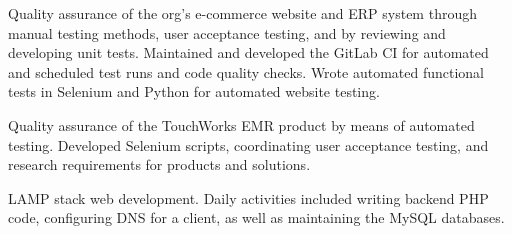\documentclass[10pt,a4paper]{altacv}
\begin{document}
\divider

Quality assurance of the org’s e-commerce website and ERP system through
manual testing methods, user acceptance testing, and by reviewing and developing unit 
tests. Maintained and developed the GitLab CI for automated and scheduled test 
runs and code quality checks. Wrote automated functional tests in Selenium and 
Python for automated website testing.

\divider

Quality assurance of the TouchWorks EMR product by means of automated testing.
Developed Selenium scripts, coordinating user acceptance testing, and research 
requirements for products and solutions.
\divider

LAMP stack web development. Daily activities included writing backend PHP code, 
configuring DNS for a client, as well as maintaining the MySQL databases.


%

% 

\end{document}
